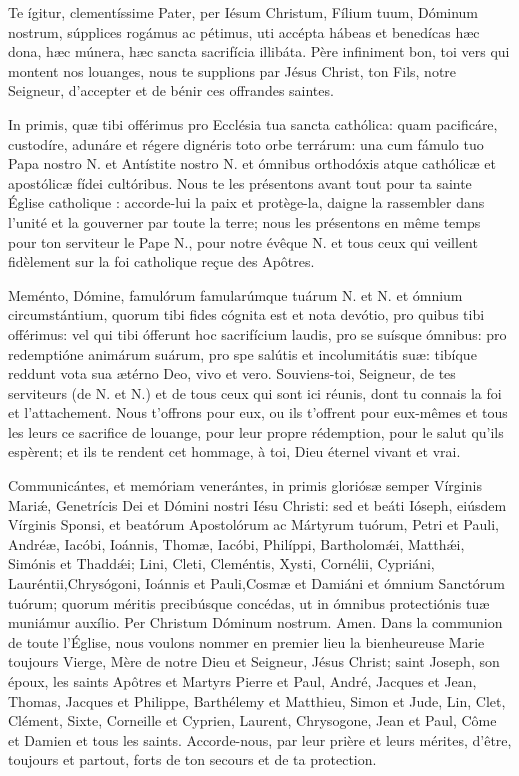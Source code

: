 \begin{paracol}{2}

\LigneParacol
{Te ígitur, clementíssime Pater, per Iésum Christum, Fílium tuum, Dóminum nostrum, súpplices rogámus ac pétimus, uti accépta hábeas et benedícas hæc dona, hæc múnera, hæc sancta sacrifícia illibáta.}
{Père infiniment bon, toi vers qui mon\-tent nos louanges, nous te supplions par Jésus Christ, ton Fils, notre Seigneur, d'accepter et de bénir ces offrandes saintes.}

\LigneParacol
{In primis, quæ tibi offérimus pro Ecclésia tua sancta cathólica: quam pacificáre, custodíre, adunáre et régere dignéris toto orbe terrárum: una cum fámulo tuo Papa nostro N. et Antístite nostro N. et ómnibus orthodóxis atque cathólicæ et apostólicæ fídei cultóribus.}
{Nous te les présentons avant tout pour ta sainte Église catholique : accorde-lui la paix et protège-la, daigne la rassembler dans l'unité et la gouverner par toute la terre; nous les présentons en même temps pour ton serviteur le Pape N., pour notre évêque N. et tous ceux qui veillent fidèlement sur la foi catholique reçue des Apôtres.}

\LigneParacol
{Meménto, Dómine, famulórum famularúmque tuárum N. et N. et ómnium circumstántium, quorum tibi fides cógnita est et nota devótio, pro quibus tibi offérimus: vel qui tibi ófferunt hoc sacrifícium laudis, pro se suísque ómnibus: pro redemptióne animárum suárum, pro spe salútis et incolumitátis suæ: tibíque reddunt vota sua ætérno Deo, vivo et vero.}
{Souviens-toi, Seigneur, de tes serviteurs (de N. et N.) et de tous ceux qui sont ici réunis, dont tu connais la foi et l'attachement. Nous t'offrons pour eux, ou ils t'offrent pour eux-mêmes et tous les leurs ce sacrifice de louange, pour leur propre rédemption, pour le salut qu'ils espèrent; et ils te rendent cet hommage, à toi, Dieu éternel vivant et vrai.}

\LigneParacol
{Communicántes, et memóriam venerántes, in primis gloriósæ semper Vírginis Mariǽ, Genetrícis Dei et Dómini nostri Iésu Christi: sed et beáti Ióseph, eiúsdem Vírginis Sponsi, et beatórum Apostolórum ac Mártyrum tuórum, Petri et Pauli, Andréæ, Iacóbi, Ioánnis, Thomæ, Iacóbi, Philíppi, Bartholomǽi, Matthǽi, Simónis et Thaddǽi; Lini, Cleti, Cleméntis, Xysti, Cornélii, Cypriáni, Lauréntii,Chrysógoni, Ioánnis et Pauli,Cosmæ et Damiáni et ómnium Sanctórum tuórum; quorum méritis precibúsque concédas, ut in ómnibus protectiónis tuæ muniámur auxílio. Per Christum Dóminum nostrum. Amen.}
{Dans la communion de toute l'Église, nous voulons nommer en premier lieu la bienheureuse Marie toujours Vierge, Mère de notre Dieu et Seigneur, Jésus Christ; saint Joseph, son époux, les saints Apôtres et Martyrs Pierre et Paul, André, Jacques et Jean, Thomas, Jacques et Philippe, Barthélemy et Matthieu, Simon et Jude, Lin, Clet, Clément, Sixte, Corneille et Cyprien, Laurent, Chrysogone, Jean et Paul, Côme et Damien et tous les saints. Accorde-nous, par leur prière et leurs mérites, d'être, toujours et partout, forts de ton secours et de ta protection.}


\end{paracol}
